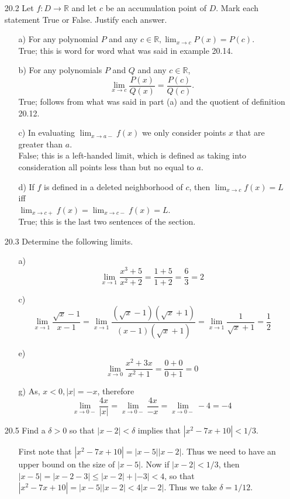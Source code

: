 \documentclass[12pt]{article}
\begin{document}
\begin{enumerate}
\begin{enumerate}
\item[20.2] Let $f: D \rightarrow \mathbb{R}$ and let $c$ be an accumulation point of $D$. Mark each statement True or False. Justify each answer.
\begin{enumerate}
\item[a)] For any polynomial $P$ and any $c \in \mathbb{R}, \lim_{x \to c}P(x) = P(c)$. \\
True; this is word for word what was said in example 20.14.
\item[b)] For any polynomials $P$ and $Q$ and any $c \in \mathbb{R}$,
\[
\lim_{x \to c}\frac{P(x)}{Q(x)} = \frac{P(c)}{Q(c)}.
\]
True; follows from what was said in part (a) and the quotient of
definition 20.12.
\item[c)] In evaluating $\lim_{x \to a-}f(x)$ we only consider points $x$ that are greater than $a$. \\
False; this is a left-handed limit, which is defined as 
taking into consideration all points less than but no equal to $a$.
\item[d)] If $f$ is defined in a deleted neighborhood of $c$, then $\lim_{x \to c}f(x) = L$ iff 
\\ $\lim_{x \to c+}f(x) = \lim_{x \to c-}f(x) = L$. \\
True; this is the last two sentences of the section.
\end{enumerate}

\item[20.3] Determine the following limits.
\begin{enumerate}
\item[a)]
\[
\lim_{x \to 1} \frac{x^3 + 5}{x^2 + 2} = \frac{1 + 5}{1 + 2} = \frac{6}{3} = 2
\]
\item[c)]
\[
\lim_{x \to 1} \frac{\sqrt{x} - 1}{x - 1} = 
\lim_{x \to 1} \frac{(\sqrt{x} - 1)(\sqrt{x} + 1)}{(x - 1)(\sqrt{x} + 1)} =
\lim_{x \to 1} \frac{1}{\sqrt{x} + 1} = \frac{1}{2}
\]
\item[e)]
\[
\lim_{x \to 0} \frac{x^2 + 3x}{x^2 + 1} = \frac{0 + 0}{0 + 1} = 0
\]
\item[g)] As, $x < 0, |x| = -x$, therefore
\[
\lim_{x \to 0-} \frac{4x}{|x|} = \lim_{x \to 0-} \frac{4x}{-x} = \lim_{x \to 0-} -4 = -4
\]
\end{enumerate}

\item[20.5] Find a $\delta > 0$ so that $|x - 2| < \delta$ implies that $|x^2 - 7x + 10| < 1/3$.
\begin{enumerate}
\item[] First note that $|x^2 - 7x + 10| = |x - 5||x - 2|$. Thus we need to have an upper
bound on the size of $|x - 5|$. Now if $|x - 2| < 1/3$, then 
$|x - 5| = |x - 2 - 3| \leq |x - 2| + |-3| < 4$, so that 
$|x^2 - 7x + 10| = |x - 5||x - 2| < 4|x - 2|$. Thus we take $\delta = 1/12$.
\end{enumerate}



\end{enumerate}
\end{enumerate}
\end{document}
